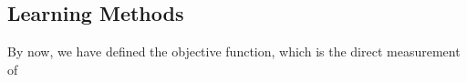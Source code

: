 \subsection {Learning Methods}
By now, we have defined the objective function, which is the direct measurement of 